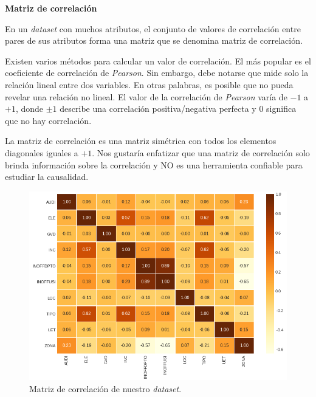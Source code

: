 \documentclass[a4paper,12pt]{article}
\begin{document}
\begin{python}

\end{python}

\textbf{Matriz de correlación}

En un \textit{dataset} con muchos atributos, el conjunto de valores de correlación entre pares de sus atributos forma una matriz que se denomina matriz de correlación.

Existen varios métodos para calcular un valor de correlación. El más popular es el coeficiente de correlación de \textit{Pearson}. Sin embargo, debe notarse que mide solo la relación lineal entre dos variables. En otras palabras, es posible que no pueda revelar una relación no lineal. El valor de la correlación de \textit{Pearson} varía de $-1$ a $+1$, donde $\pm1$ describe una correlación positiva/negativa perfecta y $0$ significa que no hay correlación. \citep{corrmatrix}

La matriz de correlación es una matriz simétrica con todos los elementos diagonales iguales a $+1$. Nos gustaría enfatizar que una matriz de correlación solo brinda información sobre la correlación y NO es una herramienta confiable para estudiar la causalidad. 

\begin{figure}[H]
	\begin{center}
	\includegraphics[width=1\textwidth]{corrmatrix.png}
  	\caption{Matriz de correlación de nuestro \textit{dataset}.}
  	\label{fig:corrmatrix}
  	\end{center}
\end{figure}
\end{document}
